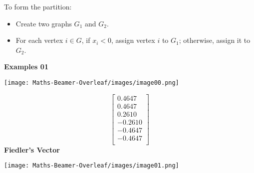 \documentclass[aspectratio=169]{beamer}
\begin{document}
\begin{frame}
    

To form the partition:

\begin{itemize}
    \item Create two graphs \( G_1 \) and \( G_2 \).
    \item For each vertex \( i \in G \), if \( x_i < 0 \), assign vertex \( i \) to \( G_1 \); otherwise, assign it to \( G_2 \).
\end{itemize}
\vspace{2mm}
\textbf{Examples 01}

\noindent
\begin{minipage}[c]{0.4\textwidth}
    \centering
    \texttt{[image: Maths-Beamer-Overleaf/images/image00.png]}
\end{minipage}%
\begin{minipage}[c]{0.2\textwidth}
    \centering
    \[
    \begin{bmatrix}
    0.4647 \\
    0.4647 \\
    0.2610 \\
    -0.2610 \\
    -0.4647 \\
    -0.4647 \\
    \end{bmatrix}
    \]
    \textbf{Fiedler's Vector}
\end{minipage}%
\hfill
\begin{minipage}[c]{0.3\textwidth}
    \centering
    \texttt{[image: Maths-Beamer-Overleaf/images/image01.png]}
\end{minipage}
\end{frame}
\end{document}
